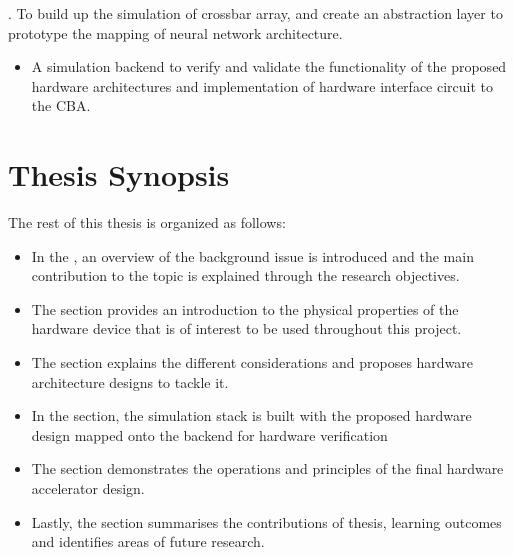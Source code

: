 . To build up the simulation of crossbar array, and create an abstraction layer to prototype the mapping of neural network architecture.
  \begin{itemize}
    \item A simulation backend to verify and validate the functionality of the proposed hardware architectures and implementation of hardware interface circuit to the \ac{CBA}.
  \end{itemize}

\section{Thesis Synopsis}

\noindent
The rest of this thesis is organized as follows:

\begin{itemize}
  \item
  In the , an overview of the background issue is introduced and the main contribution to the topic is explained through the research objectives.
  \item
  The  section provides an introduction to the physical properties of the hardware device that is of interest to be used throughout this project.
  \item
  The  section explains the different considerations and proposes hardware architecture designs to tackle it.
  \item
  In the  section, the simulation stack is built with the proposed hardware design mapped onto the backend for hardware verification
  \item
  The  section demonstrates the operations and principles of the final hardware accelerator design.
  \item
  Lastly, the  section summarises the contributions of thesis, learning outcomes and identifies areas of future research.
\end{itemize}
